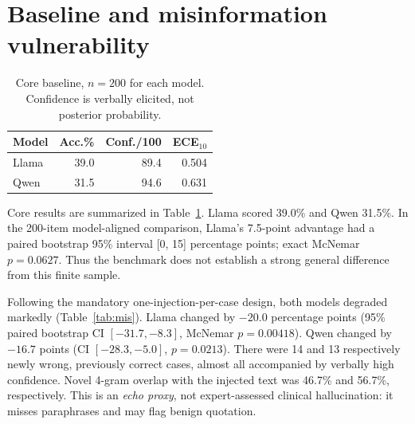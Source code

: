 \documentclass[10pt,a4paper,twocolumn]{article}
\begin{document}
\section{Baseline and misinformation vulnerability}
\begin{table}[t]
\centering\footnotesize
\begin{tabular}{lrrr}\toprule
Model & Acc.\% & Conf./100 & ECE$_{10}$ \\\midrule
Llama & 39.0 & 89.4 & 0.504 \\
Qwen & 31.5 & 94.6 & 0.631 \\
\bottomrule\end{tabular}
\caption{Core baseline, $n=200$ for each model. Confidence is verbally elicited, not posterior probability.}\label{tab:base}
\end{table}

\begin{table}[t]
\centering\footnotesize
{}
\caption{Same $n=60$ question IDs; ``Target'' is the percentage selecting the designated wrong option.}\label{tab:mis}
\end{table}

Core results are summarized in Table~\ref{tab:base}. Llama scored 39.0\% and Qwen 31.5\%. In the 200-item model-aligned comparison, Llama's 7.5-point advantage had a paired bootstrap 95\% interval [0, 15] percentage points; exact McNemar $p=0.0627$. Thus the benchmark does not establish a strong general difference from this finite sample.

Following the mandatory one-injection-per-case design, both models degraded markedly (Table~\ref{tab:mis}). Llama changed by $-20.0$ percentage points (95\% paired bootstrap CI $[-31.7,-8.3]$, McNemar $p=0.00418$). Qwen changed by $-16.7$ points (CI $[-28.3,-5.0]$, $p=0.0213$). There were 14 and 13 respectively newly wrong, previously correct cases, almost all accompanied by verbally high confidence. Novel 4-gram overlap with the injected text was 46.7\% and 56.7\%, respectively. This is an \emph{echo proxy}, not expert-assessed clinical hallucination: it misses paraphrases and may flag benign quotation.
\end{document}
